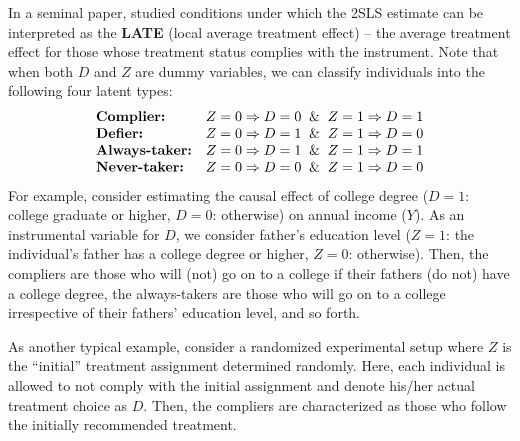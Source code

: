\documentclass[10.5pt, A4paper, openany, uplatex]{book}
\numberwithin{equation}{section}
\begin{document}
In a seminal paper, \cite{imbens1994identification} studied conditions under which the 2SLS estimate can be interpreted as the \textbf{LATE} (local average treatment effect) -- the average treatment effect for those whose treatment status complies with the instrument. 
Note that when both $D$ and $Z$ are dummy variables, we can classify individuals into the following four latent types:
\[
\begin{array}{ll}
	\text{\bf Complier:} & Z = 0 \Rightarrow D = 0 \;\; \& \;\; Z = 1 \Rightarrow D = 1 \\
	\text{\bf Defier:}   & Z = 0 \Rightarrow D = 1 \;\; \& \;\; Z = 1 \Rightarrow D = 0 \\
	\text{\bf Always-taker:} & Z = 0 \Rightarrow D = 1 \;\; \& \;\; Z = 1 \Rightarrow D = 1 \\
	\text{\bf Never-taker:}  & Z = 0 \Rightarrow D = 0 \;\; \& \;\; Z = 1 \Rightarrow D = 0 
\end{array}
\]
For example, consider estimating the causal effect of college degree ($D = 1$: college graduate or higher, $D = 0$: otherwise) on annual income ($Y$).
As an instrumental variable for $D$, we consider father's education level ($Z = 1$: the individual's father has a college degree or higher, $Z = 0$: otherwise).
Then, the compliers are those who will (not) go on to a college if their fathers (do not) have a college degree, the always-takers are those who will go on to a college irrespective of their fathers' education level, and so forth.

As another typical example, consider a randomized experimental setup where $Z$ is the ``initial'' treatment assignment determined randomly.
Here, each individual is allowed to not comply with the initial assignment and denote his/her actual treatment choice as $D$.
Then, the compliers are characterized as those who follow the initially recommended treatment.
\end{document}
